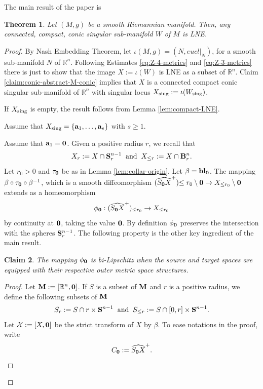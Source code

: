 \documentclass[11pt]{amsart}
\newtheorem{theorem}{Theorem}[section]
\newtheorem{claim}[theorem]{Claim}
\newcommand{\field}[1]{\mathbb{#1}}
\newcommand{\R}{\field{R}}
\newcommand{\wh}[1]{\widehat{#1}}
\newcommand{\ba}{{\bf a}}
\newcommand{\bbl}{{\bf bl}}
\newcommand{\bbo}{{\bf 0}}
\newcommand{\bB}{{\bf B}}
\newcommand{\bM}{{\bf M}}
\newcommand{\bS}{{\bf S}}
\newcommand{\cX}{\mathcal{X}}
\newcommand{\Rn}{{\R^n}}
\newcommand{\sing}{{\rm sing}}
\numberwithin{equation}{section}
\numberwithin{equation}{section}
\begin{document}
	The main result of the paper is
	\begin{theorem}\label{thm:main-compact}
		Let $(M,g)$ be a smooth Riemannian manifold. Then, any 
		connected, compact, conic singular sub-manifold $W$ of $M$ is LNE.
	\end{theorem}
	\begin{proof}
		By Nash Embedding Theorem, let $\iota(M,g) = (N,eucl|_N)$, for a smooth 
		sub-manifold $N$ of $\Rn$. 
		Following Estimates \eqref{eq:Z-4-metrics} and \eqref{eq:Z-3-metrics}
	    there is just to show that the image $X:=\iota(W)$ is LNE as a subset of $\Rn$. Claim   \ref{claim:conic-abstract-M-conic} implies that $X$ is a connected compact conic singular 
		sub-manifold of $\Rn$ with singular locus $X_\sing := \iota(W_\sing)$.
		
		If $X_\sing$ is empty, the result follows from Lemma \ref{lem:compact-LNE}.
		
		\medskip
		Assume that $X_\sing = \{\ba_1,\ldots,\ba_s\}$ with $s\geq 1$.
		
		\medskip
		Assume that $\ba_1 = \bbo$. Given a positive radius $r$, we recall that
		$$
		X_r := X \cap \bS_r^{n-1} \;\; {\rm and} \;\; X_{\leq r} := X\cap\bB_r^n.
		$$
		Let $r_0>0$ and $\tau_\bbo$ be as in Lemma \ref{lem:collar-origin}. Let $\beta = \bbl_\bbo$.
		The mapping $\beta \circ \tau_\bbo \circ \beta^{-1}$, which is a smooth 
		diffeomorphism $(\wh{S_\bbo X}^+){\leq r_0} \setminus \bbo \to
		X_{\leq r_0} \setminus \bbo$ extends as a homeomorphism 
		$$
		\phi_\bbo: (\wh{S_\bbo X}^+)_{\leq r_0} \to X_{\leq r_0}
		$$
		by continuity at $\bbo$, taking the value $\bbo$. By definition
		$\phi_\bbo$ preserves the intersection with the spheres $\bS_r^{n-1}$.
		The following property is the other key ingredient of the main result.
		\begin{claim}\label{claim:graph-origin}
			The mapping $\phi_\bbo$ is bi-Lipschitz when the source and target spaces are 
			equipped with
			their respective outer metric space structures. 
		\end{claim}
		\begin{proof}
			Let $\bM:=[\Rn,\bbo]$. If $S$ is a subset of $\bM$ and $r$ is a positive
			radius, we define the following subsets of $\bM$
			$$
			S_r := S \cap r\times\bS^{n-1} \;\; {\rm and} \;\;
			S_{\leq r} := S \cap [0,r] \times \bS^{n-1}.
			$$
			Let $\cX := [X,\bbo]$ be the strict transform of $X$ by $\beta$.
			To ease notations in the proof, write 
			$$
			C_\bbo := \wh{S_\bbo X}^+.
			$$
			

\end{proof}
\end{proof}
\end{document}
